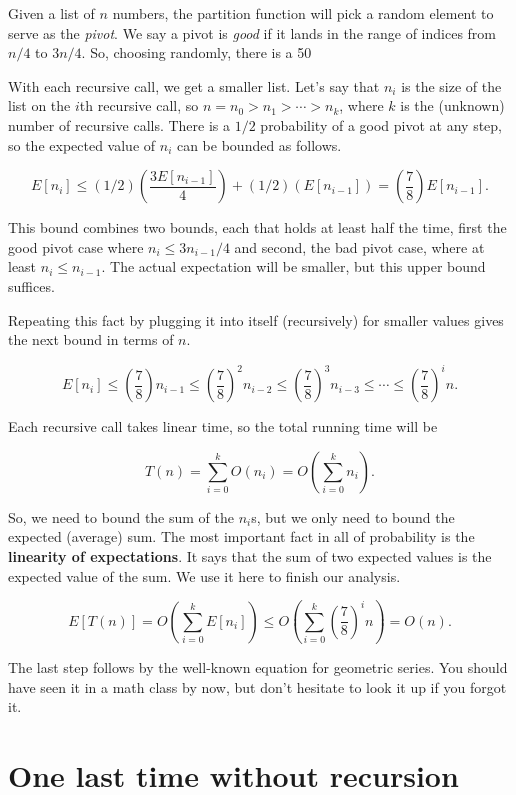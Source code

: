 Given a list of $n$ numbers, the partition function will pick a random element to serve as the \emph{pivot}.
We say a pivot is \emph{good} if it lands in the range of indices from $n/4$ to $3n/4$.
So, choosing randomly, there is a 50%


With each recursive call, we get a smaller list.  Let's say that $n_i$ is the size of the list on the $i$th recursive call, so $n = n_0 > n_1 > \cdots > n_k$, where $k$ is the (unknown) number of recursive calls.  There is a $1/2$ probability of a good pivot at any step, so the expected value of $n_i$ can be bounded as follows.


\[
E[n_i] \le (1/2)\left(\frac{3E[n_{i-1}]}{4}\right) + (1/2)(E[n_{i-1}]) = \left(\frac{7}{8}\right)E[n_{i-1}].
\]


This bound combines two bounds, each that holds at least half the time, first the good pivot case where $n_i \le 3n_{i-1}/4$ and second, the bad pivot case, where at least $n_i \le n_{i-1}$.
The actual expectation will be smaller, but this upper bound suffices.


Repeating this fact by plugging it into itself (recursively) for smaller values gives the next bound in terms of $n$.


\[
E[n_i] \le \left(\frac{7}{8}\right) n_{i-1}
\le \left(\frac{7}{8}\right)^2 n_{i-2}
\le \left(\frac{7}{8}\right)^3 n_{i-3}
\le \cdots \le
\left(\frac{7}{8}\right)^i n.
\]


Each recursive call takes linear time, so the total running time will be


\[
T(n) = \sum_{i = 0}^k O(n_i) = O(\sum_{i=0}^k n_i).
\]


So, we need to bound the sum of the $n_i$s, but we only need to bound the expected (average) sum.  The most important fact in all of probability is the \textbf{linearity of expectations}.  It says that the sum of two expected values is the expected value of the sum.  We use it here to finish our analysis.


\[
E[T(n)] = O\left(\sum_{i=0}^k E[n_i]\right) \le
O\left(\sum_{i=0}^k \left(\frac{7}{8}\right)^i n\right) = O(n).
\]


The last step follows by the well-known equation for geometric series.  You should have seen it in a math class by now, but don't hesitate to look it up if you forgot it.

\section{One last time without recursion}


